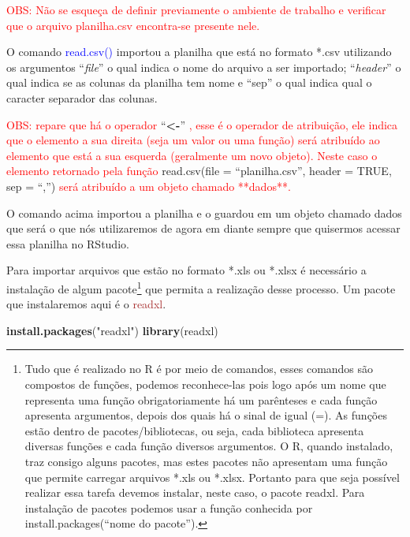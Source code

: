 \documentclass[14pt,titlepage, oneside, openany, a4paper]{book}
\newenvironment{Shaded}{\begin{snugshade}}{\end{snugshade}}
\newcommand{\KeywordTok}[1]{\textcolor[rgb]{0.13,0.29,0.53}{\textbf{#1}}}
\newcommand{\NormalTok}[1]{#1}
\newcommand{\StringTok}[1]{\textcolor[rgb]{0.31,0.60,0.02}{#1}}
\begin{document}
\textcolor{red}{OBS: Não se esqueça de definir previamente o ambiente de trabalho e verificar que o arquivo planilha.csv encontra-se presente nele.}

O comando \textcolor{blue}{read.csv()} importou a planilha que está no formato *.csv utilizando os argumentos ``\emph{file}'' o qual indica o nome do arquivo a ser importado; ``\emph{header}'' o qual indica se as colunas da planilha tem nome e ``sep'' o qual indica qual o caracter separador das colunas.

\textcolor{red}{OBS: repare que há o operador} ``\textbf{\textless{}-}'' \textcolor{red}{, esse é o operador de atribuição, ele indica que o elemento a sua direita (seja um valor ou uma função) será atribuído ao elemento que está a sua esquerda (geralmente um novo objeto). Neste caso o elemento retornado pela função } read.csv(file = ``planilha.csv'', header = TRUE, sep = ``,'') \textcolor{red}{ será atribuído a um objeto chamado **dados**.}

O comando acima importou a planilha e o guardou em um objeto chamado dados que será o que nós utilizaremos de agora em diante sempre que quisermos acessar essa planilha no RStudio.

Para importar arquivos que estão no formato *.xls ou *.xlsx é necessário a instalação de algum pacote\footnote{Tudo que é realizado no R é por meio de comandos, esses comandos são compostos de funções, podemos reconhece-las pois logo após um nome que representa uma função obrigatoriamente há um parênteses e cada função apresenta argumentos, depois dos quais há o sinal de igual (=). As funções estão dentro de pacotes/bibliotecas, ou seja, cada biblioteca apresenta diversas funções e cada função diversos argumentos. O R, quando instalado, traz consigo alguns pacotes, mas estes pacotes não apresentam uma função que permite carregar arquivos *.xls ou *.xlsx. Portanto para que seja possível realizar essa tarefa devemos instalar, neste caso, o pacote readxl. Para instalação de pacotes podemos usar a função conhecida por install.packages(``nome do pacote'').} que permita a realização desse processo. Um pacote que instalaremos aqui é o \textcolor{brown}{readxl}.

\begin{Shaded}
\begin{Highlighting}[]
\KeywordTok{install.packages}\NormalTok{(}\StringTok{"readxl"}\NormalTok{)}
\KeywordTok{library}\NormalTok{(readxl)}
\end{Highlighting}
\end{Shaded}
\end{document}
